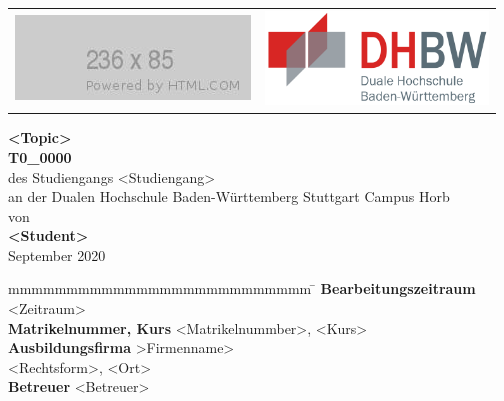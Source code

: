 
\begin{titlepage}
	\begin{longtable}{p{8.2cm} p{5.4cm}}
		\includegraphics{Abbildungen/FirmenLogo.jpg} &
		\includegraphics[height=2.5cm]{Abbildungen/DHBW.png}
	\end{longtable}
	\enlargethispage{20mm}
	\begin{center}
		\vspace*{12mm}	\LARGE\textbf{<Topic>}\\
		\vspace*{12mm}	\large\textbf{T0\_0000}\\
		\vspace*{12mm}	des Studiengangs <Studiengang>\\
    \vspace*{3mm}		an der Dualen Hochschule Baden-Württemberg Stuttgart Campus Horb\\
		\vspace*{12mm}	von\\
		\vspace*{3mm}		\large\textbf{<Student>}\\
		\vspace*{12mm}	September 2020\\
	\end{center}
	\vfill
	\begin{spacing}{1.2}
	\begin{tabbing}
		mmmmmmmmmmmmmmmmmmmmmmmmmm             \= \kill
		\textbf{Bearbeitungszeitraum}      		\>  <Zeitraum>\\
		\textbf{Matrikelnummer, Kurs}  			\>  <Matrikelnummber>, <Kurs>\\
		\textbf{Ausbildungsfirma}              \>  >Firmenname>\\
		\> <Rechtsform>, <Ort>\\
		\textbf{Betreuer}               		\\
	\end{tabbing}
	\end{spacing}
\end{titlepage}
